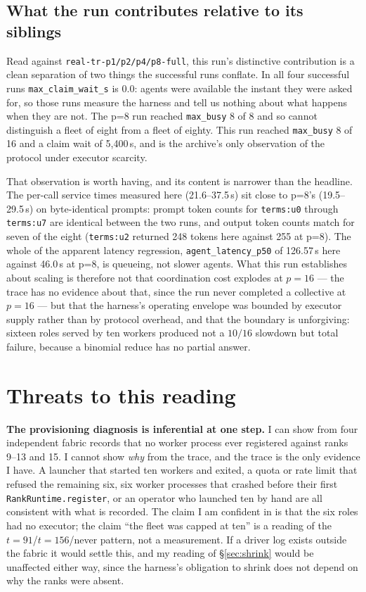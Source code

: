 \documentclass[11pt]{article}
\begin{document}
\subsection{What the run contributes relative to its siblings}

Read against \texttt{real-tr-p1/p2/p4/p8-full}, this run's distinctive contribution is a
clean separation of two things the successful runs conflate. In all four successful runs
\texttt{max\_claim\_wait\_s} is 0.0: agents were available the instant they were asked
for, so those runs measure the harness and tell us nothing about what happens when they
are not. The p=8 run reached \texttt{max\_busy} 8 of 8 and so cannot distinguish a fleet
of eight from a fleet of eighty. This run reached \texttt{max\_busy} 8 of 16 and a claim
wait of 5{,}400\,s, and is the archive's only observation of the protocol under executor
scarcity.

That observation is worth having, and its content is narrower than the headline. The
per-call service times measured here (21.6--37.5\,s) sit close to p=8's
(19.5--29.5\,s) on byte-identical prompts: prompt token counts for \texttt{terms:u0}
through \texttt{terms:u7} are identical between the two runs, and output token counts
match for seven of the eight (\texttt{terms:u2} returned 248 tokens here against 255 at
p=8). The whole of the apparent latency regression, \texttt{agent\_latency\_p50} of 126.57\,s here
against 46.0\,s at p=8, is queueing, not slower agents. What this run establishes about
scaling is therefore not that coordination cost explodes at $p=16$ --- the trace has no
evidence about that, since the run never completed a collective at $p=16$ --- but that the
harness's operating envelope was bounded by executor supply rather than by protocol
overhead, and that the boundary is unforgiving: sixteen roles served by ten workers
produced not a $10/16$ slowdown but total failure, because a binomial reduce has no
partial answer.

\section{Threats to this reading}

\textbf{The provisioning diagnosis is inferential at one step.} I can show from four
independent fabric records that no worker process ever registered against ranks 9--13 and
15. I cannot show \emph{why} from the trace, and the trace is the only evidence I have.
A launcher that started ten workers and exited, a quota or rate limit that refused the
remaining six, six worker processes that crashed before their first
\texttt{RankRuntime.register}, or an operator who launched ten by hand are all consistent
with what is recorded. The claim I am confident in is that the six roles had no executor;
the claim ``the fleet was capped at ten'' is a reading of the $t=91$/$t=156$/never
pattern, not a measurement. If a driver log exists outside the fabric it would settle
this, and my reading of \S\ref{sec:shrink} would be unaffected either way, since the
harness's obligation to shrink does not depend on why the ranks were absent.
\end{document}

